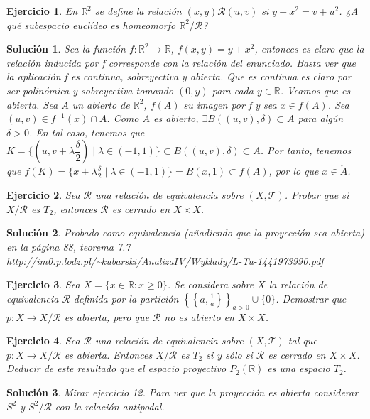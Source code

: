\documentclass{article}
\theoremstyle{plain}
\newtheorem{exercise}{Ejercicio}
\newtheorem*{sol*}{Solución}
\newcommand{\R}{\mathbb{R}}
\begin{document}
\newpage
\begin{exercise}
En $\mathbb{R}^2$ se define la relación $(x,y) \mathcal{R} (u,v)$ si $y+x^2 = v+u^2$. ¿A qué subespacio euclídeo es homeomorfo $\mathbb{R}^2/\mathcal{R}$?
\end{exercise}
\begin{sol*}
Sea la función $f: \R^2 \to \R$, $f(x,y)=y+x^2$, entonces es claro que la relación inducida por f corresponde con la relación del enunciado. Basta ver que la aplicación f es continua, sobreyectiva y abierta. Que es continua es claro por ser polinómica y sobreyectiva tomando $(0,y)$ para cada $y\in\R$. 
\newline
Veamos que es abierta. Sea $A$ un abierto de $\R^2$, $f(A)$ su imagen por f y sea $x\in f(A)$. Sea $(u,v)\in f^{-1}(x)\cap A$. Como $A$ es abierto, $\exists B((u,v),\delta)\subset A$ para algún $\delta>0$. En tal caso, tenemos que $K=\{(u,v+\lambda \dfrac{\delta}{2}) \mid \lambda \in (-1,1)\}\subset B((u,v),\delta) \subset A$. Por tanto, tenemos que $f(K) = \{x+\lambda\frac{\delta}{2} \mid \lambda \in (-1,1)\} = B(x,1) \subset f(A)$, por lo que $x\in \mathring{A}$.
\end{sol*}

\newpage
\begin{exercise}
Sea $\mathcal{R}$ una relación de equivalencia sobre $(X, \mathcal{T})$. Probar que si $X/\mathcal{R}$ es $T_2$, entonces $\mathcal{R}$ es cerrado en $X \times X$.
\end{exercise}
\begin{sol*}
Probado como equivalencia (añadiendo que la proyección sea abierta) en la página 88, teorema 7.7 \url{http://im0.p.lodz.pl/~kubarski/AnalizaIV/Wyklady/L-Tu-1441973990.pdf}
\end{sol*}

\newpage
\begin{exercise}
Sea $X = \{x \in \mathbb{R} : x \geq 0\}$. Se considera sobre $X$ la relación de equivalencia $\mathcal{R}$ definida por la partición $\left\{\left\{a, \frac{1}{a}\right\} \right\}_{a > 0} \cup \{0\}$. Demostrar que $p : X \to X/\mathcal{R}$ es abierta, pero que $\mathcal{R}$ no es abierto en $X \times X$.
\end{exercise}


\newpage
\begin{exercise}
Sea $\mathcal{R}$ una relación de equivalencia sobre $(X, \mathcal{T})$ tal que $p : X \to X/\mathcal{R}$ es abierta. Entonces $X/\mathcal{R}$ es $T_2$ si y sólo si $\mathcal{R}$ es cerrado en $X \times X$. Deducir de este resultado que el espacio proyectivo $P_2(\mathbb{R})$ es una espacio $T_2$.
\end{exercise}
\begin{sol*}
Mirar ejercicio 12. Para ver que la proyección es abierta considerar $S^2$ y $S^2/\mathcal{R}$ con la relación antipodal. 
\end{sol*}
\end{document}
